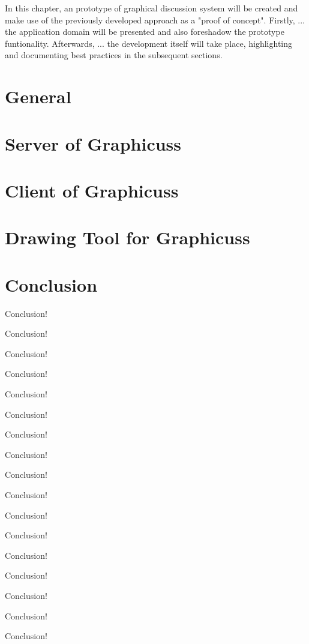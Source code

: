 In this chapter, an prototype of graphical discussion system will be created and make use of the previously developed approach as a "proof of concept". Firstly, ... the application domain will be presented and also foreshadow the prototype funtionality. Afterwards, ... the development itself will take place, highlighting and documenting best practices in the subsequent sections.


\section{General}


\section{Server of Graphicuss}


\section{Client of Graphicuss}


\section{Drawing Tool for Graphicuss}\label{sec:drawing-imp}


% 

\section{Conclusion}
Conclusion!

Conclusion!

Conclusion!

Conclusion!

Conclusion!

Conclusion!

Conclusion!

Conclusion!

Conclusion!


Conclusion!

Conclusion!

Conclusion!

Conclusion!


Conclusion!

Conclusion!

Conclusion!

Conclusion!

